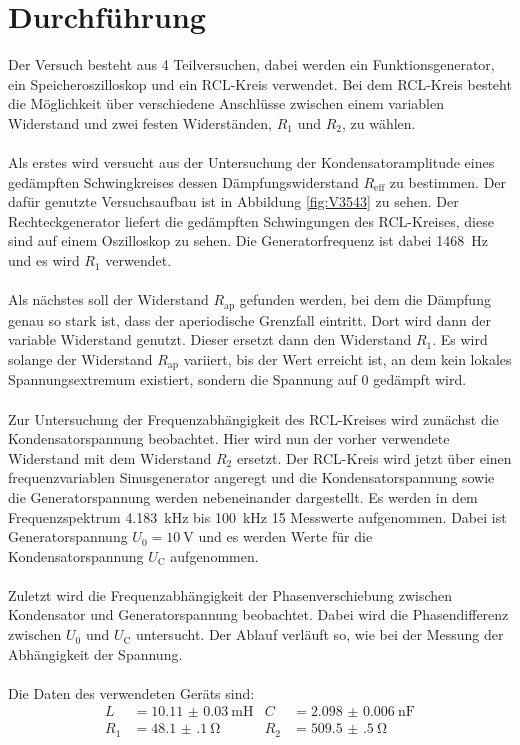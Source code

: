 \documentclass[
  bibliography=totoc,     %
  captions=tableheading,  %
  titlepage=firstiscover, %
]{scrartcl}
\begin{document}
\section{Durchführung}
\label{sec:durchführung}
Der Versuch besteht aus 4 Teilversuchen, dabei werden ein Funktionsgenerator,
ein Speicheroszilloskop und ein RCL-Kreis verwendet. Bei dem RCL-Kreis besteht
die Möglichkeit über verschiedene Anschlüsse zwischen einem variablen Widerstand
und zwei festen Widerständen, $R_1$ und $R_2$, zu wählen. \\
\\
Als erstes wird versucht aus der Untersuchung der Kondensatoramplitude eines
gedämpften Schwingkreises dessen Dämpfungswiderstand $R_\mathup{eff}$ zu bestimmen.
Der dafür genutzte Versuchsaufbau ist in Abbildung \ref{fig:V3543} zu sehen. Der Rechteckgenerator
liefert die gedämpften Schwingungen des RCL-Kreises, diese sind auf einem
Oszilloskop zu sehen. Die Generatorfrequenz ist dabei \SI{1468}{\hertz} und es wird $R_1$ verwendet. \\
\\
Als nächstes soll der Widerstand $R_\mathup{ap}$ gefunden werden, bei dem die Dämpfung
genau so stark ist, dass der aperiodische Grenzfall eintritt. Dort wird dann
der variable Widerstand genutzt. Dieser ersetzt dann den Widerstand $R_1$. Es
wird solange der Widerstand $R_\mathup{ap}$ variiert, bis der Wert erreicht ist, an dem
kein lokales Spannungsextremum existiert, sondern die Spannung auf 0 gedämpft
wird. \\
\\
Zur Untersuchung der Frequenzabhängigkeit des RCL-Kreises wird zunächst die
Kondensatorspannung beobachtet. Hier wird nun der vorher verwendete Widerstand
mit dem Widerstand $R_2$ ersetzt. Der RCL-Kreis wird jetzt über einen
frequenzvariablen Sinusgenerator angeregt und die Kondensatorspannung sowie die
Generatorspannung werden nebeneinander dargestellt. Es werden in dem
Frequenzspektrum \SI{4.183}{\kilo\hertz} bis \SI{100}{\kilo\hertz} 15 Messwerte
aufgenommen. Dabei ist Generatorspannung $U_0=\SI{10}{\volt}$ und es werden Werte
für die Kondensatorspannung $U_\mathup{C}$ aufgenommen.\\
\\
Zuletzt wird die Frequenzabhängigkeit der Phasenverschiebung zwischen
Kondensator und Generatorspannung beobachtet. Dabei wird die Phasendifferenz
zwischen $U_0$ und $U_\mathup{C}$ untersucht. Der Ablauf verläuft so, wie
bei der Messung der Abhängigkeit der Spannung.\\
\\
Die Daten des verwendeten Geräts sind:
\begin{align}
  L&=\SI{10.11(3)}{\milli\henry} & C&=\SI{2.098(6)}{\nano\farad}\\
  R_1&=\SI{48.1(1)}{\ohm} & R_2&=\SI{509.5(5)}{\ohm}
\end{align}
\clearpage
\end{document}
